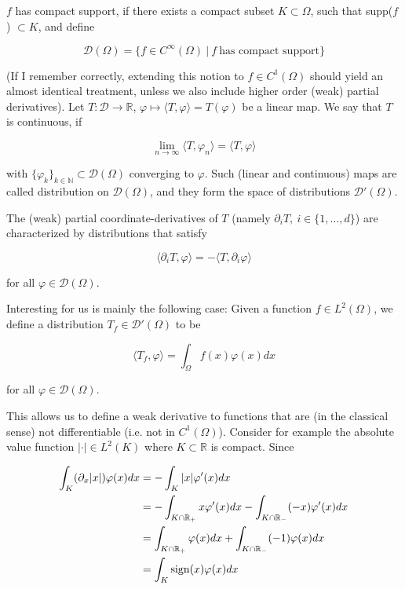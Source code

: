 \documentclass[11pt, a4paper]{article}
\begin{document}
$f$ has compact support, if there exists a compact subset $K \subset \Omega$,
such that supp($f$) $\subset K$, and define

\begin{equation}
    \mathcal{D}(\Omega) = \{f \in C^{\infty}(\Omega) ~|~ f ~\text{has compact support}\}
\end{equation}

(If I remember correctly, extending this notion to $f \in C^1(\Omega)$ should yield
an almost identical treatment, unless we also include higher order (weak) partial derivatives).
Let $T: \mathcal{D} \to \mathbb{R}$, $\varphi \mapsto \langle T, \varphi \rangle = T(\varphi)$
be a linear map. We say that $T$ is continuous, if

\begin{equation}
    \lim_{n\to\infty} \langle T, \varphi_n \rangle = \langle T, \varphi \rangle
\end{equation}

with $\{\varphi_k\}_{k \in \mathbb{N}} \subset \mathcal{D}(\Omega)$ converging to $\varphi$.
Such (linear and continuous) maps are called distribution on $\mathcal{D}(\Omega)$,
and they form the space of distributions $\mathcal{D}'(\Omega)$.

The (weak) partial coordinate-derivatives of $T$ (namely $\partial_i T, ~i \in \{1, \dots, d\}$)
are characterized by distributions that satisfy

\begin{equation}
    \langle \partial_i T, \varphi \rangle = - \langle T, \partial_i \varphi \rangle 
\end{equation}

for all $\varphi \in \mathcal{D}(\Omega)$. 

Interesting for us is mainly the following case:
Given a function $f \in L^2(\Omega)$, we define a distribution $T_f \in \mathcal{D}'(\Omega)$
to be 

\begin{equation}
    \langle T_f , \varphi \rangle = \int_{\Omega} f(x) \varphi(x) dx
\end{equation}

for all $\varphi \in \mathcal{D}(\Omega)$.

This allows us to define a weak derivative to functions that are (in the classical
sense) not differentiable (i.e. not in $C^1(\Omega)$). Consider for example the 
absolute value function $|\cdot| \in L^2(K)$ where $K \subset \mathbb{R}$ is compact.
Since

\begin{align}
    \int_K (\partial_x |x|) \varphi(x) dx &= -\int_K |x| \varphi'(x) dx \notag \\ 
    &= - \int_{K \cap \mathbb{R}_+} x \varphi'(x) dx - \int_{K \cap \mathbb{R}_-} (-x) \varphi'(x) dx \notag \\ 
    &= \int_{K \cap \mathbb{R}_+} \varphi(x) dx + \int_{K \cap \mathbb{R}_-} (-1) \varphi(x) dx \notag \\
    &= \int_K \text{sign}(x) \varphi(x) dx
\end{align}
\end{document}
